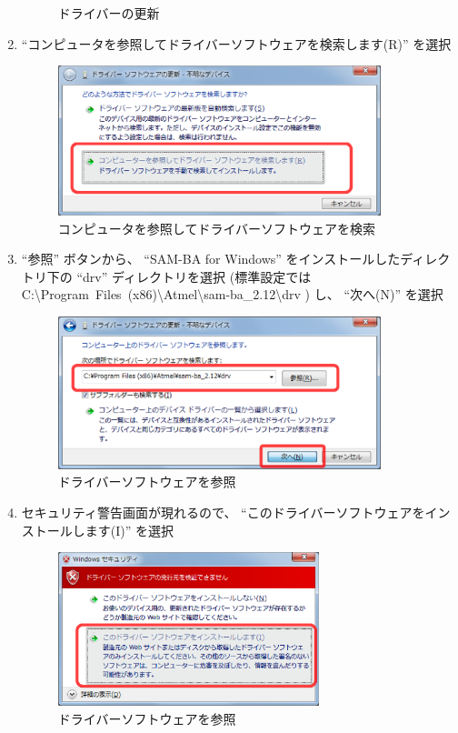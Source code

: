 \documentclass[11pt,a4j,openany]{jbook}
\begin{document}
\begin{enumerate}
\begin{figure}[H]
			\caption{ドライバーの更新}
			\label{fig:windriver.device_prop}
		\end{figure}
	\item ``コンピュータを参照してドライバーソフトウェアを検索します(R)'' を選択
		\begin{figure}[H]
			\centering\includegraphics[width=94mm]{windriver-install.6.driversearch.eps}
			\caption{コンピュータを参照してドライバーソフトウェアを検索}
			\label{fig:windriver.driversearch}
		\end{figure}
	\item ``参照'' ボタンから、 ``SAM-BA for Windows'' をインストールしたディレクトリ下の ``drv'' ディレクトリを選択 (標準設定では C:{\textbackslash}Program~Files~(x86){\textbackslash}Atmel{\textbackslash}sam-ba\_2.12{\textbackslash}drv ) し、 ``次へ(N)'' を選択
		\begin{figure}[H]
			\centering\includegraphics[width=94mm]{windriver-install.7.driverfile.eps}
			\caption{ドライバーソフトウェアを参照}
			\label{fig:windriver.driverfile}
		\end{figure}
	\item セキュリティ警告画面が現れるので、 ``このドライバーソフトウェアをインストールします(I)'' を選択
		\begin{figure}[H]
			\centering\includegraphics[width=76mm]{windriver-install.8.security.eps}
			\caption{ドライバーソフトウェアを参照}
			\label{fig:windriver.security}
		\end{figure}
\end{enumerate}
\par
\end{document}
